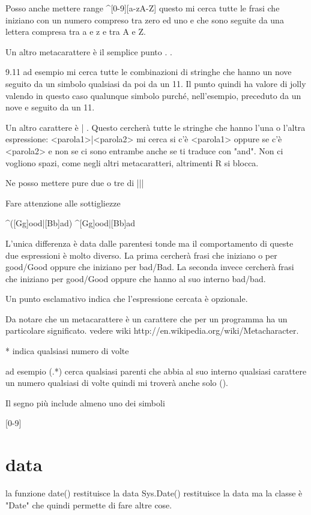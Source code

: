 Posso anche mettere range
^[0-9][a-zA-Z]  questo mi cerca tutte le frasi che iniziano con un numero compreso tra zero ed uno e che sono seguite da una lettera compresa tra a e z e tra A e Z.

Un altro metacarattere è il semplice punto . .

	9.11 ad esempio mi cerca tutte le combinazioni di stringhe che hanno un nove seguito da un simbolo qualsiasi da poi da un 11. Il punto quindi ha valore di jolly valendo in questo caso qualunque simbolo purché, nell'esempio, preceduto da un nove e seguito da un 11.

Un altro carattere è | . Questo cercherà tutte le stringhe che hanno l'una o l'altra espressione:  <parola1>|<parola2> mi cerca si c'è <parola1> oppure se c'è <parola2> e non se ci sono entrambe anche se ti traduce con "and". Non ci vogliono spazi, come negli altri metacaratteri, altrimenti R si blocca.

Ne posso mettere pure due o tre di  |||


Fare attenzione alle sottigliezze 

^([Gg]ood|[Bb]ad)
^[Gg]ood|[Bb]ad

L'unica differenza è data dalle parentesi tonde ma il comportamento di queste due espressioni è molto diverso. La prima cercherà frasi che iniziano o per good/Good oppure che iniziano per bad/Bad. La seconda invece cercherà frasi che iniziano per good/Good oppure che hanno al suo interno bad/bad.

Un punto esclamativo indica che l'espressione cercata è opzionale.

Da notare che un metacarattere è un carattere che per un programma ha un particolare significato. vedere wiki http://en.wikipedia.org/wiki/Metacharacter.


* indica qualsiasi numero di volte

ad esempio (.*) cerca qualsiasi parenti che abbia al suo interno qualsiasi carattere un numero qualsiasi di volte quindi mi troverà anche solo ().

Il segno più include almeno uno dei simboli

[0-9]




\section{data}
la funzione date() restituisce la data
Sys.Date() restituisce la data ma la classe è "Date" che quindi permette di fare altre cose.

